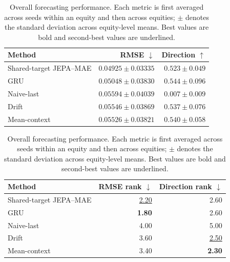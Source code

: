 \begin{table}[t]
\centering
\small
\caption{Overall forecasting performance. Each metric is first averaged across seeds within an equity and then across equities; $\pm$ denotes the standard deviation across equity-level means. Best values are bold and second-best values are underlined.}
\label{tab:main_metrics}
\begin{tabular}{lrr}
\toprule
Method & RMSE $\downarrow$ & Direction $\uparrow$ \\
\midrule
Shared-target JEPA--MAE & \textbf{$0.04925 \pm 0.03335$} & $0.523 \pm 0.049$ \\
GRU & \underline{$0.05048 \pm 0.03830$} & \textbf{$0.544 \pm 0.096$} \\
Naive-last & $0.05594 \pm 0.04039$ & $0.007 \pm 0.009$ \\
Drift & $0.05546 \pm 0.03869$ & $0.537 \pm 0.076$ \\
Mean-context & $0.05526 \pm 0.03821$ & \underline{$0.540 \pm 0.058$} \\
\bottomrule
\end{tabular}
\par\medskip
\begin{tabular}{lrr}
\toprule
Method & RMSE rank $\downarrow$ & Direction rank $\downarrow$ \\
\midrule
Shared-target JEPA--MAE & \underline{2.20} & 2.60 \\
GRU & \textbf{1.80} & 2.60 \\
Naive-last & 4.00 & 5.00 \\
Drift & 3.60 & \underline{2.50} \\
Mean-context & 3.40 & \textbf{2.30} \\
\bottomrule
\end{tabular}
\end{table}
